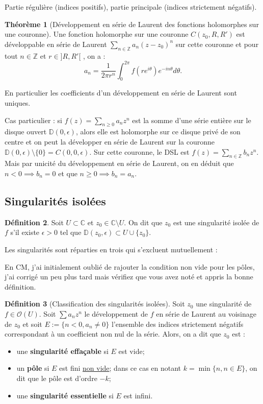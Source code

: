 \documentclass[11pt,a4paper]{article}
\newcommand{\Z}{\mathbb{Z}}
\newcommand{\D}{\mathbb{D}}
\newcommand{\C}{\mathbb{C}}
\theoremstyle{definition}
\newtheorem{theoreme}{Th\'eor\`eme}[section]
\newtheorem{definition}[theoreme]{D\'efinition}
\theoremstyle{plain}
\begin{document}
Partie régulière (indices positifs), partie principale (indices strictement négatifs).

\begin{theoreme}[Développement en série de Laurent des fonctions holomorphes sur une couronne]
Une fonction holomorphe sur une couronne $C(z_0,R,R')$ est développable en série de Laurent $\sum_{n\in\Z} a_n(z-z_0)^n$ sur cette couronne et pour tout $n\in\Z$ et $r \in ]R,R'[$ , on a :
\[a_n = \frac{1}{2\pi r^n}\int_0^{2\pi}f\left(re^{i\theta}\right)e^{-in\theta}d\theta. \]
\end{theoreme}

En particulier les coefficients d'un développement en série de Laurent sont uniques.

\begin{remarque}
Cas particulier : si $f(z)=\sum_{n\geq 0} a_nz^n$ est la somme d'une série entière  sur le disque ouvert $\D(0,\epsilon)$, alors elle est holomorphe sur ce disque privé de son centre et on peut la développer en série de Laurent sur la couronne $\D(0,\epsilon)\setminus \{0\} = C(0,0,\epsilon)$. Sur cette couronne, le DSL est $f(z) = \sum_{n\in\Z} b_nz^n$. Mais par unicité du développement en série de Laurent, on en déduit que $n<0 \implies b_n=0$ et que $n\geq 0 \implies b_n=a_n$.
\end{remarque}

\subsection{Singularités isolées}

\begin{definition}
Soit $U\subset \C$ et $z_0\in \C\setminus U$. On dit que $z_0$ est une singularité isolée de $f$ s'il existe $\epsilon>0$ tel que $\D(z_0,\epsilon) \subset U\cup \{z_0\}$.
\end{definition}

Les singularités sont réparties en trois qui s'excluent mutuellement :
\begin{attention}
En CM, j'ai initialement oublié de rajouter la condition \og non vide\fg{} pour les pôles, j'ai corrigé un peu plus tard mais vérifiez que vous avez noté et appris la bonne définition.
\end{attention}

\begin{definition}[Classification des singularités isolées]
Soit $z_0$ une singularité de $f\in \mathcal O(U)$. Soit $\sum a_nz^n$ le développement de $f$ en série de Laurent au voisinage de $z_0$ et soit  $E := \{n<0, a_n\neq 0\}$ l'ensemble des indices strictement négatifs correspondant à un coefficient non nul de la série. Alors, on a dit que $z_0$ est :
\begin{itemize}
\item une \textbf{singularité effaçable} si $E$ est vide;
\item un \textbf{pôle} si $E$ est fini \underline{non vide}; dans ce cas en notant $k=\min\{n, n\in E\}$, on dit que le pôle est d'ordre $-k$;
\item une \textbf{singularité essentielle} si $E$ est infini.
\end{itemize}
\end{definition}
\end{document}
